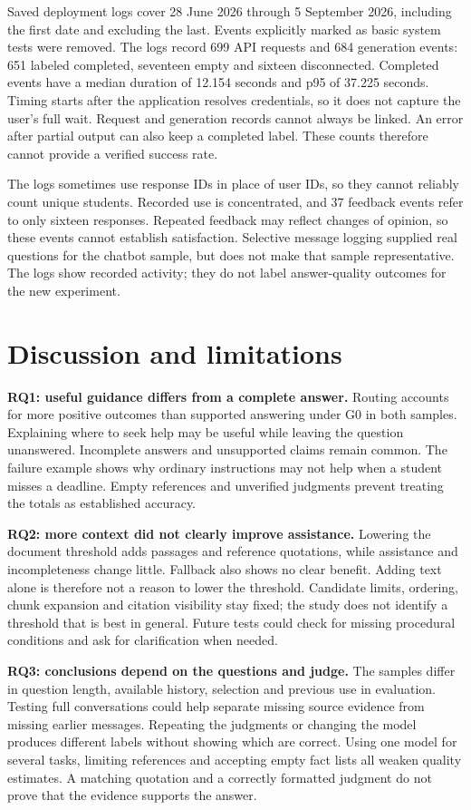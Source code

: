 \documentclass[a4paper,10pt,twocolumn]{article}
\begin{document}
Saved deployment logs cover 28 June 2026 through 5 September 2026, including the first date and excluding the last. Events explicitly marked as basic system tests were removed. The logs record 699 API requests and 684 generation events: 651 labeled completed, seventeen empty and sixteen disconnected. Completed events have a median duration of 12.154 seconds and p95 of 37.225 seconds. Timing starts after the application resolves credentials, so it does not capture the user's full wait. Request and generation records cannot always be linked. An error after partial output can also keep a completed label. These counts therefore cannot provide a verified success rate.

The logs sometimes use response IDs in place of user IDs, so they cannot reliably count unique students. Recorded use is concentrated, and 37 feedback events refer to only sixteen responses. Repeated feedback may reflect changes of opinion, so these events cannot establish satisfaction. Selective message logging supplied real questions for the chatbot sample, but does not make that sample representative. The logs show recorded activity; they do not label answer-quality outcomes for the new experiment.

\section{Discussion and limitations}
\textbf{RQ1: useful guidance differs from a complete answer.} Routing accounts for more positive outcomes than supported answering under G0 in both samples. Explaining where to seek help may be useful while leaving the question unanswered. Incomplete answers and unsupported claims remain common. The failure example shows why ordinary instructions may not help when a student misses a deadline. Empty references and unverified judgments prevent treating the totals as established accuracy.

\textbf{RQ2: more context did not clearly improve assistance.} Lowering the document threshold adds passages and reference quotations, while assistance and incompleteness change little. Fallback also shows no clear benefit. Adding text alone is therefore not a reason to lower the threshold. Candidate limits, ordering, chunk expansion and citation visibility stay fixed; the study does not identify a threshold that is best in general. Future tests could check for missing procedural conditions and ask for clarification when needed.

\textbf{RQ3: conclusions depend on the questions and judge.} The samples differ in question length, available history, selection and previous use in evaluation. Testing full conversations could help separate missing source evidence from missing earlier messages. Repeating the judgments or changing the model produces different labels without showing which are correct. Using one model for several tasks, limiting references and accepting empty fact lists all weaken quality estimates. A matching quotation and a correctly formatted judgment do not prove that the evidence supports the answer.
\end{document}
